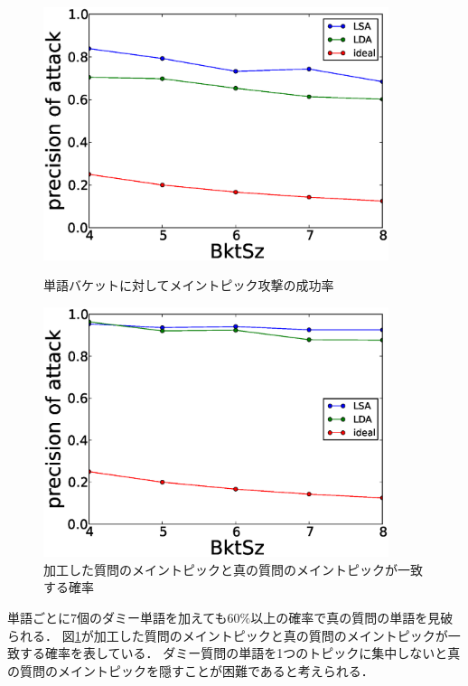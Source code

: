 \documentclass[master]{suribt}
\theoremstyle{definition}
\begin{document}
 \begin{figure}
 \begin{minipage}[t]{0.5\linewidth}
 \centering
 \includegraphics[width=0.9\textwidth]{ETSQ1.eps}
 \vspace{5em}
 \caption{単語バケットに対してメイントピック攻撃の成功率}
 \label{fig:mt1}
 \end{minipage}%
 \begin{minipage}[t]{0.5\linewidth}
 \centering
 \includegraphics[width=0.9\textwidth]{ETSQ2.eps}
 \vspace{5em}
 \caption{加工した質問のメイントピックと真の質問のメイントピックが一致する確率}
 \label{fig:mt2}
 \end{minipage}
 \end{figure}
 
 単語ごとに$7$個のダミー単語を加えても$60\%$以上の確率で真の質問の単語を見破られる．
 図\ref{fig:mt2}が加工した質問のメイントピックと真の質問のメイントピックが一致する確率を表している．
 ダミー質問の単語を1つのトピックに集中しないと真の質問のメイントピックを隠すことが困難であると考えられる．
 
\end{document}
